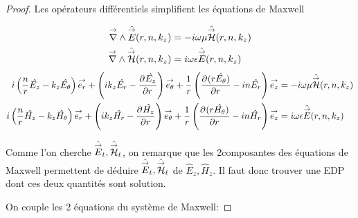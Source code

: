   \begin{proof}

    Les opérateurs différentiels simplifient les équations de Maxwell

    \begin{align}
      \vrot \hat \vE(r,n,k_z) &=-i\w\mu \hat \vH(r,n,k_z)
      \\
      \vrot \hat \vH(r,n,k_z) &= i\w\eps \hat \vE(r,n,k_z)
    \end{align}
    \begin{align}
      i\left(\frac{n}{r}\hat{E_z} - k_z\hat{E_\theta}\right)\vect{e_r} +
      \left(ik_z\hat{E_r} - \ddr{r}{\hat{E_z}}\right)\vect{e_\theta} +
      \frac{1}{r}\left(\ddr{r}{(r\hat{E_\theta})}-in\hat{E_r}\right)\vect{e_z}
      &=-i\w\mu \hat \vH(r,n,k_z)
      \\
      i\left(\frac{n}{r}\hat{H_z} - k_z\hat{H_\theta}\right)\vect{e_r} +
      \left(ik_z\hat{H_r} - \ddr{r}{\hat{H_z}}\right)\vect{e_\theta} +
      \frac{1}{r}\left(\ddr{r}{(r\hat{H_\theta})}-in\hat{H_r}\right)\vect{e_z}
      &=i\w\eps \hat \vE(r,n,k_z)
    \end{align}

    Comme l'on cherche \(\hat \vE_t, \hat \vH_t\), on remarque que les 2\ieme composantes des équations de Maxwell permettent de déduire \(\hat\vE_t, \hat\vH_t\) de \( \hat E_z, \hat H_z\). Il faut donc trouver une EDP dont ces deux quantités sont solution.

    On couple les 2 équations du système de Maxwell:




\end{proof}
